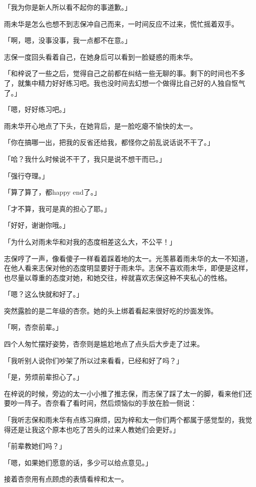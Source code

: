 \documentclass[UTF8]{ctexart}
\begin{document}
    「我为你是新人所以看不起你的事道歉。」

    雨未华是怎么也想不到志保冲自己而来，一时间反应不过来，慌忙摇着双手。

    「啊，嗯，没事没事，我一点都不在意。」

    志保一度回头看着自己，在她身后可以看到一脸疑惑的雨未华。

    「和梓说了一些之后，觉得自己之前都在纠结一些无聊的事。剩下的时间也不多了，就集中精力好好练习吧。我也没时间去幻想一个做得比自己好的人独自怄气了。」

    「嗯，好好练习吧。」

    雨未华开心地点了下头，在她背后，是一脸吃瘪不愉快的太一。

    「你在搞哪一出，把我的反省还给我，都怪你之前乱说话说不干了。」

    「哈？我什么时候说不干了，我只是说不想干而已。」

    「强行夺理。」

    「算了算了，都happy end了。」

    「才不算，我可是真的担心了耶。」

    「好好，谢谢你哦。」

    「为什么对雨未华和对我的态度相差这么大，不公平！」

    志保哼了一声，像看傻子一样看着踩着地的太一。光羡慕着雨未华的太一不知道，在他人看来志保对他的态度明显要好于雨未华。志保不喜欢雨未华，即便是这样，也尽量以尊重的态度对她，和她交往，梓就喜欢志保这种不夹私心的性格。

    「嗯？这么快就和好了。」

    突然露脸的是二年级的杏奈。她的头上绑着看起来很好吃的炒面发饰。

    「啊，杏奈前辈。」

    四个人匆忙摆好姿势，杏奈则是尴尬地点了点头后大步走了过来。

    「我听别人说你们吵架了所以过来看看，已经和好了吗？」

    「是，劳烦前辈担心了。」

    在梓说的时候，旁边的太一小小推了推志保，而志保了踩了太一的脚，看来他们还要吵一阵子。杏奈看了看时间，然后烦恼似的手放在脸一侧说：

    「我听志保和雨未华有点练习麻烦，因为梓和太一你们两个都属于感觉型的，我觉得还是让我这个原本也吃了苦头的过来人教她们会更好。」

    「前辈教她们吗？」

    「嗯，如果她们愿意的话，多少可以给点意见。」

    接着杏奈用有点顾虑的表情看梓和太一。
\end{document}
